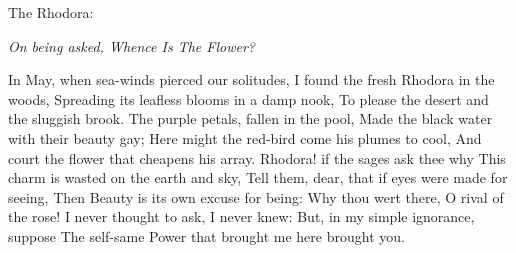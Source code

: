 The Rhodora:

\emph{On being asked, Whence Is The Flower?}

In May, when sea-winds pierced our solitudes,
I found the fresh Rhodora in the woods,
Spreading its leafless blooms in a damp nook,
To please the desert and the sluggish brook.
The purple petals, fallen in the pool,
Made the black water with their beauty gay;
Here might the red-bird come his plumes to cool,
And court the flower that cheapens his array.
Rhodora! if the sages ask thee why
This charm is wasted on the earth and sky,
Tell them, dear, that if eyes were made for seeing,
Then Beauty is its own excuse for being:
Why thou wert there, O rival of the rose!
I never thought to ask, I never knew:
But, in my simple ignorance, suppose
The self-same Power that brought me here brought you.

